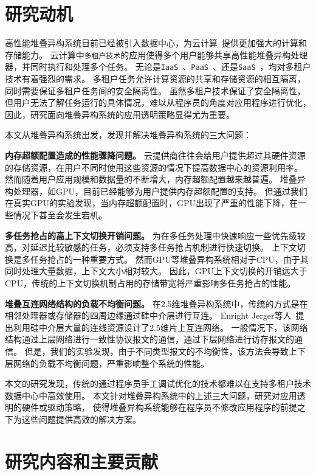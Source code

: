 \section{研究动机}
高性能堆叠异构系统目前已经被引入数据中心，为云计算~提供更加强大的计算和存储能力。
云计算中\texttt{多租户技术}的应用使得多个用户能够共享高性能堆叠异构处理器，并同时执行和处理多个任务。
无论是\texttt{IaaS}~、\texttt{PaaS}~、还是\texttt{SaaS}~，均对多租户技术有着强烈的需求。
多租户任务允许计算资源的共享和存储资源的相互隔离，同时需要保证多租户任务间的安全隔离性。
虽然多租户技术保证了安全隔离性，但用户无法了解任务运行的具体情况，难以从程序员的角度对应用程序进行优化，
因此，研究面向堆叠异构系统的应用透明策略显得尤为重要。

本文从堆叠异构系统出发，发现并解决堆叠异构系统的三大问题：

\textbf{内存超额配置造成的性能骤降问题。}
云提供商往往会给用户提供超过其硬件资源的存储资源，在用户不同时使用这些资源的情况下提高数据中心的资源利用率。
然而随着用户应用规模和数据量的不断增大，内存超额配置越来越普遍。
堆叠异构处理器，如GPU，目前已经能够为用户提供内存超额配置的支持。
但通过我们在真实GPU的实验发现，当内存超额配置时，GPU出现了严重的性能下降，在一些情况下甚至会发生宕机。

\textbf{多任务抢占的高上下文切换开销问题。}
为在多任务处理中快速响应一些优先级较高，对延迟比较敏感的任务，必须支持多任务抢占机制进行快速切换。
上下文切换是多任务抢占的一种重要方式。
然而GPU等堆叠异构系统相对于CPU，由于其同时处理大量数据，上下文大小相对较大。
因此，GPU上下文切换的开销远大于CPU，传统的上下文切换机制占用的存储带宽将严重影响多任务抢占的性能。

\textbf{堆叠互连网络结构的负载不均衡问题。}
在2.5维堆叠异构系统中，传统的方式是在相邻处理器或存储器的四周边缘通过硅中介层进行互连。
Enright Jerger等人~提出利用硅中介层大量的连线资源设计了2.5维片上互连网络。
一般情况下，该网络结构通过上层网络进行一致性协议报文的通信，通过下层网络进行访存报文的通信。
但是，我们的实验发现，由于不同类型报文的不均衡性，该方法会导致上下层网络的负载不均衡问题，严重影响整个系统的性能。

本文的研究发现，传统的通过程序员手工调试优化的技术都难以在支持多租户技术数据中心中高效使用。
本文针对堆叠异构系统中的上述三大问题，研究对应用透明的硬件或驱动策略，
使得堆叠异构系统能够在程序员不修改应用程序的前提之下为这些问题提供高效的解决方案。

\section{研究内容和主要贡献}

